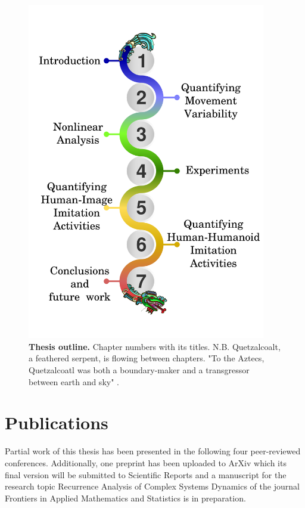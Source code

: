 \begin{figure}
\centering
\includegraphics[width=0.93\textwidth]{toutline}
    \caption[Thesis outline]{
	{\bf Thesis outline.}
	Chapter numbers with its titles. 
	N.B. Quetzalcoalt, a feathered serpent, is flowing between chapters.
	"To the Aztecs, Quetzalcoatl 
	was both a boundary-maker and a transgressor 
	between earth and sky" \citep{wiki:quetzalcoatl}. 
	}
    \label{fig:thesis-outline}
\end{figure}

\section{Publications}
Partial work of this thesis has been presented in the following four 
peer-reviewed conferences. Additionally, one preprint has been 
uploaded to ArXiv which its final version will be submitted 
to Scientific Reports and 
a manuscript for the research topic 
Recurrence Analysis of Complex Systems Dynamics
of the journal Frontiers in Applied Mathematics and Statistics
is in preparation. 

